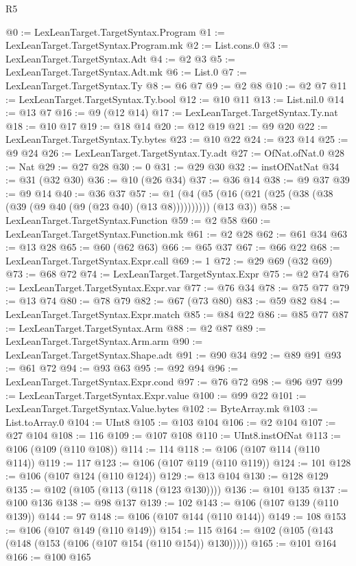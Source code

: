 \begin{lexlean}{R5}
\begin{coremodule}
@0 := LexLeanTarget.TargetSyntax.Program
@1 := LexLeanTarget.TargetSyntax.Program.mk
@2 := List.cons.{0}
@3 := LexLeanTarget.TargetSyntax.Adt
@4 := @2 @3
@5 := LexLeanTarget.TargetSyntax.Adt.mk
@6 := List.{0}
@7 := LexLeanTarget.TargetSyntax.Ty
@8 := @6 @7
@9 := @2 @8
@10 := @2 @7
@11 := LexLeanTarget.TargetSyntax.Ty.bool
@12 := @10 @11
@13 := List.nil.{0}
@14 := @13 @7
@16 := @9 (@12 @14)
@17 := LexLeanTarget.TargetSyntax.Ty.nat
@18 := @10 @17
@19 := @18 @14
@20 := @12 @19
@21 := @9 @20
@22 := LexLeanTarget.TargetSyntax.Ty.bytes
@23 := @10 @22
@24 := @23 @14
@25 := @9 @24
@26 := LexLeanTarget.TargetSyntax.Ty.adt
@27 := OfNat.ofNat.{0}
@28 := Nat
@29 := @27 @28
@30 := 0
@31 := @29 @30
@32 := instOfNatNat
@34 := @31 (@32 @30)
@36 := @10 (@26 @34)
@37 := @36 @14
@38 := @9 @37
@39 := @9 @14
@40 := @36 @37
@57 := @1 (@4 (@5 (@16 (@21 (@25 (@38 (@38 (@39 (@9 @40 (@9 (@23 @40) (@13 @8)))))))))) (@13 @3))
@58 := LexLeanTarget.TargetSyntax.Function
@59 := @2 @58
@60 := LexLeanTarget.TargetSyntax.Function.mk
@61 := @2 @28
@62 := @61 @34
@63 := @13 @28
@65 := @60 (@62 @63)
@66 := @65 @37
@67 := @66 @22
@68 := LexLeanTarget.TargetSyntax.Expr.call
@69 := 1
@72 := @29 @69 (@32 @69)
@73 := @68 @72
@74 := LexLeanTarget.TargetSyntax.Expr
@75 := @2 @74
@76 := LexLeanTarget.TargetSyntax.Expr.var
@77 := @76 @34
@78 := @75 @77
@79 := @13 @74
@80 := @78 @79
@82 := @67 (@73 @80)
@83 := @59 @82
@84 := LexLeanTarget.TargetSyntax.Expr.match
@85 := @84 @22
@86 := @85 @77
@87 := LexLeanTarget.TargetSyntax.Arm
@88 := @2 @87
@89 := LexLeanTarget.TargetSyntax.Arm.arm
@90 := LexLeanTarget.TargetSyntax.Shape.adt
@91 := @90 @34
@92 := @89 @91
@93 := @61 @72
@94 := @93 @63
@95 := @92 @94
@96 := LexLeanTarget.TargetSyntax.Expr.cond
@97 := @76 @72
@98 := @96 @97
@99 := LexLeanTarget.TargetSyntax.Expr.value
@100 := @99 @22
@101 := LexLeanTarget.TargetSyntax.Value.bytes
@102 := ByteArray.mk
@103 := List.toArray.{0}
@104 := UInt8
@105 := @103 @104
@106 := @2 @104
@107 := @27 @104
@108 := 116
@109 := @107 @108
@110 := UInt8.instOfNat
@113 := @106 (@109 (@110 @108))
@114 := 114
@118 := @106 (@107 @114 (@110 @114))
@119 := 117
@123 := @106 (@107 @119 (@110 @119))
@124 := 101
@128 := @106 (@107 @124 (@110 @124))
@129 := @13 @104
@130 := @128 @129
@135 := @102 (@105 (@113 (@118 (@123 @130))))
@136 := @101 @135
@137 := @100 @136
@138 := @98 @137
@139 := 102
@143 := @106 (@107 @139 (@110 @139))
@144 := 97
@148 := @106 (@107 @144 (@110 @144))
@149 := 108
@153 := @106 (@107 @149 (@110 @149))
@154 := 115
@164 := @102 (@105 (@143 (@148 (@153 (@106 (@107 @154 (@110 @154)) @130)))))
@165 := @101 @164
@166 := @100 @165

\end{coremodule}
\end{lexlean}
